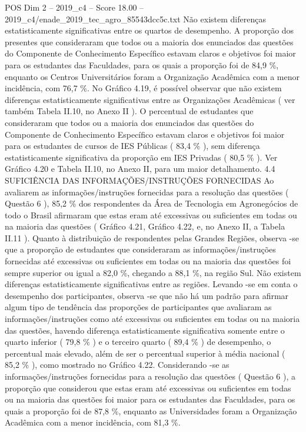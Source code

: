 \begin{textsample}{POS Dim 2 – 2019\_c4 – Score 18.00 – 2019\_c4/enade\_2019\_tec\_agro\_85543dcc5c.txt}
Não existem diferenças estatisticamente significativas entre os quartos de desempenho.
A proporção dos presentes que consideraram que todos ou a maioria dos enunciados das questões do Componente de Conhecimento Específico estavam claros e objetivos foi maior para os estudantes das Faculdades, para os quais a proporção foi de 84,9 \%, enquanto os Centros Universitários foram a Organização Acadêmica com a menor incidência, com 76,7 \%.
No Gráfico 4.19, é possível observar que não existem diferenças estatisticamente significativas entre as Organizações Acadêmicas ( ver também Tabela II.10, no Anexo II ).
O percentual de estudantes que consideraram que todos ou a maioria dos enunciados das questões do Componente de Conhecimento Específico estavam claros e objetivos foi maior para os estudantes de cursos de IES Públicas ( 83,4 \% ), sem diferença estatisticamente significativa da proporção em IES Privadas ( 80,5 \% ).
Ver Gráfico 4.20 e Tabela II.10, no Anexo II, para um maior detalhamento. 4.4 SUFICIÊNCIA DAS INFORMAÇÕES/INSTRUÇÕES FORNECIDAS Ao avaliarem as informações/instruções fornecidas para a resolução das questões ( Questão 6 ), 85,2 \% dos respondentes da Área de Tecnologia em Agronegócios de todo o Brasil afirmaram que estas eram até excessivas ou suficientes em todas ou na maioria das questões ( Gráfico 4.21, Gráfico 4.22, e, no Anexo II, a Tabela II.11 ).
Quanto à distribuição de respondentes pelas Grandes Regiões, observa -se que a proporção de estudantes que consideraram as informações/instruções fornecidas até excessivas ou suficientes em todas ou na maioria das questões foi sempre superior ou igual a 82,0 \%, chegando a 88,1 \%, na região Sul.
Não existem diferenças estatisticamente significativas entre as regiões.
Levando -se em conta o desempenho dos participantes, observa -se que não há um padrão para afirmar algum tipo de tendência das proporções de participantes que avaliaram as informações/instruções como até excessivas ou suficientes em todas ou na maioria das questões, havendo diferença estatisticamente significativa somente entre o quarto inferior ( 79,8 \% ) e o terceiro quarto ( 89,4 \% ) de desempenho, o percentual mais elevado, além de ser o percentual superior à média nacional ( 85,2 \% ), como mostrado no Gráfico 4.22.
Considerando -se as informações/instruções fornecidas para a resolução das questões ( Questão 6 ), a proporção que considerou que estas eram até excessivas ou suficientes em todas ou na maioria das questões foi maior para os estudantes das Faculdades, para os quais a proporção foi de 87,8 \%, enquanto as Universidades foram a Organização Acadêmica com a menor incidência, com 81,3 \%.

\end{textsample}

